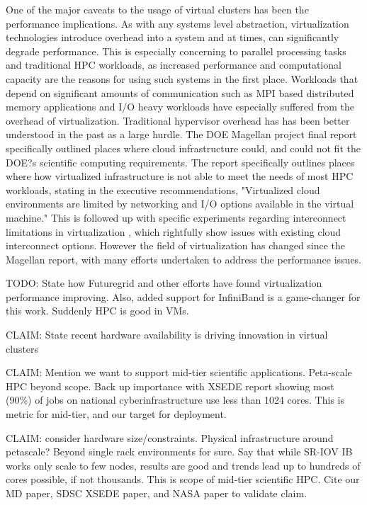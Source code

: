 One of the major caveats to the usage of virtual clusters has been the performance implications. As with any systems level abstraction, virtualization technologies introduce overhead into a system and at times, can significantly degrade performance. This is especially concerning to parallel processing tasks and traditional HPC workloads, as increased performance and computational capacity are the reasons for using such systems in the first place. Workloads that depend on significant amounts of communication such as MPI based distributed memory applications and I/O heavy workloads have especially suffered from the overhead of virtualization. Traditional hypervisor overhead has has been better understood in the past as a large hurdle. The DOE Magellan project final report \cite{MegallanFinal} specifically outlined places where cloud infrastructure could, and could not fit the DOE?s scientific computing requirements. The report specifically outlines places where how virtualized infrastructure is not able to meet the needs of most HPC workloads, stating in the executive recommendations, "Virtualized cloud environments are limited by networking and I/O options available in the virtual machine." This is followed up with specific experiments regarding interconnect limitations in virtualization \cite{Ramakrishnan2012}, which rightfully show issues with existing cloud interconnect options.  However the field of virtualization has changed since the Magellan report, with many efforts undertaken to address the performance issues. 

TODO: State how Futuregrid and other efforts have found virtualization performance improving. Also, added support for InfiniBand is a game-changer for this work. Suddenly HPC is good in VMs.

\cite{hazelhurst2008scientific}
\cite{Luszczek:2011:EHC}
\cite{fox2013futuregrid}
\cite{jose2013sr}
\cite{Musleh2014cloud}

CLAIM: State recent hardware availability is driving innovation in virtual clusters

CLAIM: Mention we want to support mid-tier scientific applications. Peta-scale HPC beyond scope. Back up importance with XSEDE report showing most (90\%) of jobs on national cyberinfrastructure use less than 1024 cores. This is metric for mid-tier, and our target for deployment.  

CLAIM: consider hardware size/constraints. Physical infrastructure around petascale? Beyond single rack environments for sure. Say that while SR-IOV IB works only scale to few nodes, results are good and trends lead up to hundreds of cores possible, if not thousands. This is scope of mid-tier scientific HPC. Cite our MD paper, SDSC XSEDE paper, and NASA paper to validate claim.


